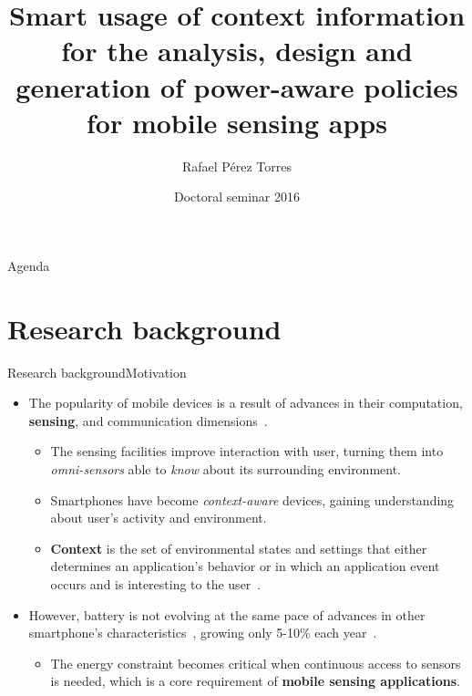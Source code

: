 \documentclass[8pt,xcolor={dvipsnames},handout]{beamer}
\title[Smart usage of context information for the analysis, design and generation of power-aware policies for MSA's]{Smart usage of context information for the analysis, design and generation of power-aware policies for mobile sensing apps}
\date{Doctoral seminar 2016}
\author[ITL Cinvestav-Tamaulipas]{
  Rafael Pérez Torres
}
\institute[
  ITL Information Technology Laboratory\\
  Cinvestav\\
  Tamaulipas
] 
{  Dr. César Torres Huitzil\\
  Dr. Hiram Galeana Zapién\\

  LTI Cinvestav
  
}
\begin{document}
{\aauwavesbg%
\begin{frame} %
  \titlepage
\end{frame}}

\begin{frame}{Agenda}{}
\tableofcontents
\end{frame}

\section{Research background}
\begin{frame}{Research background}{Motivation}
\begin{itemize}
  \item<1-> The popularity of mobile devices is a result of advances in their computation, \textbf{sensing}, and communication dimensions~\cite{Islam2014}.
  \begin{itemize}
    \item<1-> The sensing facilities improve interaction with user, turning them into \emph{omni-sensors} able to \emph{know} about its surrounding environment.
    \item<2-> Smartphones have become \emph{context-aware} devices, gaining understanding about user's activity and environment.
    \item<3-> \textbf{Context} is the set of environmental states and settings that either determines an application's behavior or in which an application event occurs and is interesting to the user~\cite{Chen2000}.
  \end{itemize}
  \item<4-> However, battery is not evolving at the same pace of advances in other smartphone's characteristics~\cite{Kjaergaard2012}, growing only 5-10\% each year~\cite{Ma2012,Evarts2015}.
  \begin{itemize}
    \item The energy constraint becomes critical when continuous access to sensors is needed, which is a core requirement of \textbf{mobile sensing applications}. 
  \end{itemize}
\end{itemize}
\end{frame}
\end{document}
